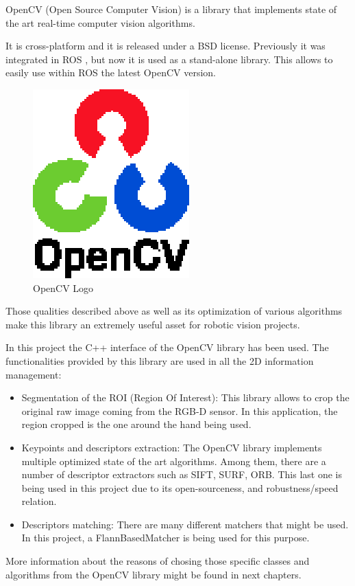 OpenCV\cite{opencv} (Open Source Computer Vision) is a library that implements state of the art real-time computer vision 
algorithms. 

It is cross-platform and it is released under a BSD\cite{BSD} license. Previously it was integrated in ROS \cite{ros}, but
now it is used as a stand-alone library. This allows to easily use within ROS the latest OpenCV version. 

\begin{figure}[h]
	\begin{center}
    \includegraphics[scale=1]{img/opencv/logo.eps}
	\caption[OpenCV Logo]{OpenCV Logo}
	\end{center}
\end{figure}

Those qualities described above as well as its optimization of various algorithms make this library an extremely useful 
asset for robotic vision projects. 


In this project the C++ interface of the OpenCV library has been used. The functionalities provided by this library 
are used in all the 2D information management: 
\begin{itemize}
	\item{Segmentation of the ROI (Region Of Interest): } This library allows to crop the original raw image coming
	from the RGB-D sensor. In this application, the region cropped is the one around the hand being used. 
	\item {Keypoints and descriptors extraction: } The OpenCV library implements multiple optimized state of the art
	algorithms. Among them, there are a number of descriptor extractors such as SIFT, SURF, ORB. This last one is 
	being used in this project due to its open-sourceness, and robustness/speed relation. 
	\item {Descriptors matching: } There are many different matchers that might be used. In this project, a FlannBasedMatcher
	is being used for this purpose. 
\end{itemize}

More information about the reasons of chosing those specific classes and algorithms from the OpenCV library might be found
in next chapters. 

